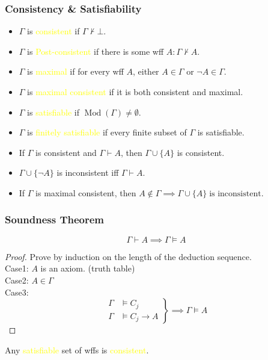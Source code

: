 \documentclass[UTF8,11pt,colorlinks,compress,openany]{beamer}%
\begin{document}
\begin{frame}\frametitle{Consistency \& Satisfiability}
	\begin{itemize}
		\item $\Gamma$ is \textcolor{yellow}{consistent} if $\Gamma\nvdash\bot$.
		\item $\Gamma$ is \textcolor{yellow}{Post-consistent} if there is some wff $A:\Gamma\nvdash A$.
		\begin{center}
		\end{center}
		\item $\Gamma$ is \textcolor{yellow}{maximal} if for every wff $A$, either $A\in\Gamma$ or $\neg A\in\Gamma$.
		\item $\Gamma$ is \textcolor{yellow}{maximal consistent} if it is both consistent and maximal.
	\end{itemize}
	\begin{itemize}
		\item $\Gamma$ is \textcolor{yellow}{satisfiable} if $\operatorname{Mod}(\Gamma)\neq\emptyset$.
		\item $\Gamma$ is \textcolor{yellow}{finitely satisfiable} if every finite subset of $\Gamma$ is satisfiable.
	\end{itemize}
	\begin{block}{}
		\begin{itemize}
			\item If $\Gamma$ is consistent and $\Gamma\vdash A$, then $\Gamma\cup\{A\}$ is consistent.
			\item $\Gamma\cup\{\neg A\}$ is inconsistent iff $\Gamma\vdash A$.
			\item {\small If $\Gamma$ is maximal consistent, then $A\notin\Gamma\implies\Gamma\cup\{A\}\;\text{is inconsistent}$.}
		\end{itemize}
	\end{block}
\end{frame}

\begin{frame}\frametitle{Soundness Theorem}
	\begin{theorem}
		\[\Gamma\vdash A\implies\Gamma\vDash A\]
	\end{theorem}
	\begin{proof}
		Prove by induction on the length of the deduction sequence.\\
		Case1: $A$ is an axiom. (truth table)\\
		Case2: $A\in\Gamma$\\
		Case3:
		\[\left.
		\begin{aligned}
		\Gamma&\vDash C_j\\
		\Gamma&\vDash C_j\to A
		\end{aligned}\right\}\implies\Gamma\vDash A\]
	\end{proof}
	\begin{corollary}
		Any \textcolor{yellow}{satisfiable} set of wffs is \textcolor{yellow}{consistent}.
	\end{corollary}
\end{frame}
\end{document}
